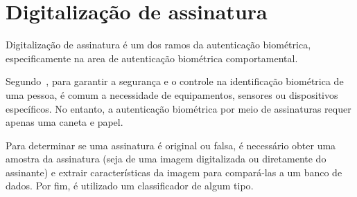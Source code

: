 \section{Digitalização de assinatura}

Digitalização de assinatura é um dos ramos da autenticação biométrica,
especificamente
na area de autenticação biométrica comportamental.

Segundo~\textcite{navaz2016}, para garantir a segurança e o controle na
identificação
biométrica de uma pessoa, é comum a necessidade de equipamentos, sensores ou
dispositivos específicos.
No entanto, a autenticação biométrica por meio de assinaturas requer apenas uma
caneta e papel.

Para determinar se uma assinatura é original ou falsa, é necessário obter uma
amostra da assinatura (seja de uma imagem digitalizada ou diretamente do
assinante)
e extrair características da imagem para compará-las a um banco de dados.
Por fim, é utilizado um classificador de algum tipo\cite{dewangan2015}.
\newpage

